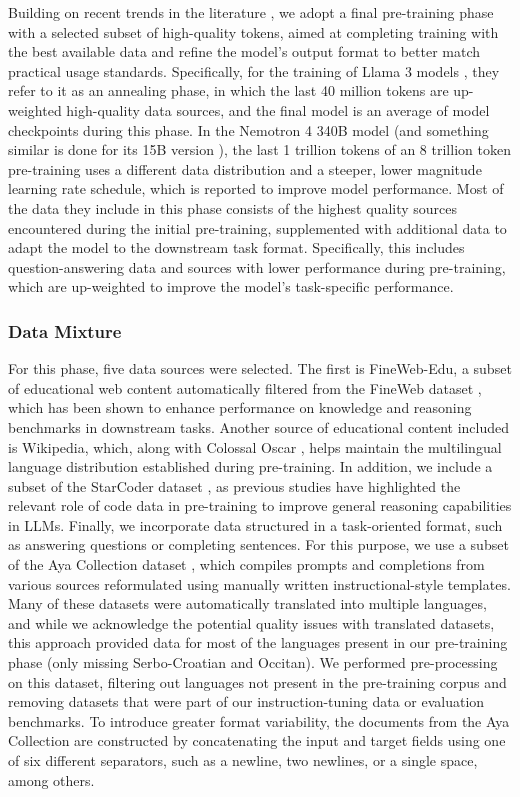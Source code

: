 Building on recent trends in the literature \cite{llama3, nemotron4}, we adopt a final pre-training phase with a selected subset of high-quality tokens, aimed at completing training with the best available data and refine the model's output format to better match practical usage standards. Specifically, for the training of Llama 3 models \cite{llama3}, they refer to it as an annealing phase, in which the last 40 million tokens are up-weighted high-quality data sources, and the final model is an average of model checkpoints during this phase. In the Nemotron 4 340B model \cite{nemotron4} (and something similar is done for its 15B version \cite{nemotron4-15b}), the last 1 trillion tokens of an 8 trillion token pre-training uses a different data distribution and a steeper, lower magnitude learning rate schedule, which is reported to improve model performance. Most of the data they include in this phase consists of the highest quality sources encountered during the initial pre-training, supplemented with additional data to adapt the model to the downstream task format. Specifically, this includes question-answering data and sources with lower performance during pre-training, which are up-weighted to improve the model's task-specific performance. 

\subsubsection{Data Mixture}
For this phase, five data sources were selected. The first is FineWeb-Edu, a subset of educational web content automatically filtered from the FineWeb dataset \cite{penedo_fineweb_2024}, which has been shown to enhance performance on knowledge and reasoning benchmarks in downstream tasks. Another source of educational content included is Wikipedia, which, along with Colossal Oscar \cite{brack_community_2024}, helps maintain the multilingual language distribution established during pre-training. In addition, we include a subset of the StarCoder dataset \cite{li_starcoder_2023}, as previous studies \cite{ma2023trainingstagedoescode, yang2024llmwizardcodewand} have highlighted the relevant role of code data in pre-training to improve general reasoning capabilities in LLMs. Finally, we incorporate data structured in a task-oriented format, such as answering questions or completing sentences. For this purpose, we use a subset of the Aya Collection dataset \cite{singh_aya_2024}, which compiles prompts and completions from various sources reformulated using manually written instructional-style templates. Many of these datasets were automatically translated into multiple languages, and while we acknowledge the potential quality issues with translated datasets, this approach provided data for most of the languages present in our pre-training phase (only missing Serbo-Croatian and Occitan). We performed pre-processing on this dataset, filtering out languages not present in the pre-training corpus and removing datasets that were part of our instruction-tuning data or evaluation benchmarks. To introduce greater format variability, the documents from the Aya Collection are constructed by concatenating the input and target fields using one of six different separators, such as a newline, two newlines, or a single space, among others. 

